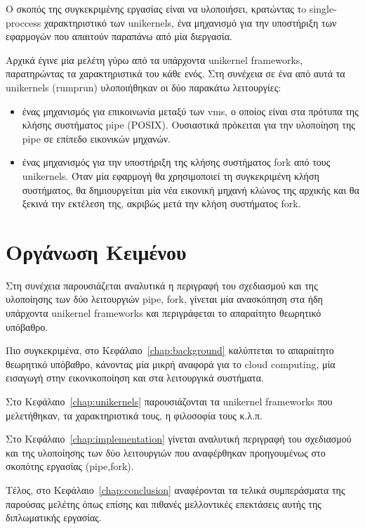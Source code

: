 Ο σκοπός της συγκεκριμένης εργασίας είναι να υλοποιήσει, κρατώντας τo
single-proccess χαρακτηριστικό των unikernels, ένα μηχανισμό για την υποστήριξη
των εφαρμογών που απαιτούν παραπάνω από μία διεργασία. 

Αρχικά έγινε μία μελέτη γύρω από τα υπάρχοντα unikernel frameworks, παρατηρώντας
τα χαρακτηριστικά του κάθε ενός. Στη συνέχεια σε ένα από αυτά τα unikernels
(rumprun) υλοποιήθηκαν οι δύο παρακάτω λειτουργίες:

\begin{itemize}
\item ένας μηχανισμός για επικοινωνία μεταξύ των vms, ο οποίος είναι στα πρότυπα
της κλήσης συστήματος pipe (POSIX). Ουσιαστικά πρόκειται για την υλοποίηση της
pipe σε επίπεδο εικονικών μηχανών. 
\item  ένας μηχανισμός για την υποστήριξη της κλήσης συστήματος fork από τους
unikernels. Όταν μία εφαρμογή θα χρησιμοποιεί τη συγκεκριμένη κλήση συστήματος,
θα δημιουργείται μία νέα εικονική μηχανή κλώνος της αρχικής και θα ξεκινά την
εκτέλεση της, ακριβώς μετά την κλήση συστήματος fork.
\end{itemize}

\section{Οργάνωση Κειμένου}
Στη συνέχεια παρουσιάζεται αναλυτικά η περιγραφή του σχεδιασμού και της
υλοποίησης των δύο λειτουργιών pipe, fork, γίνεται μία ανασκόπηση στα ήδη
υπάρχοντα unikernel frameworks και περιγράφεται το απαραίτητο θεωρητικό υπόβαθρο.

Πιο συγκεκριμένα, στο Κεφάλαιο~\ref{chap:background} καλύπτεται το απαραίτητο
θεωρητικό υπόβαθρο, κάνοντας μία μικρή αναφορά για το cloud computing, μία
εισαγωγή στην εικονικοποίηση και στα λειτουργικά συστήματα. 

Στο Κεφάλαιο~\ref{chap:unikernels} παρουσιάζονται τα unikernel frameworks που
μελετήθηκαν, τα χαρακτηριστικά τους, η φιλοσοφία τους κ.λ.π. 

Στο Κεφάλαιο~\ref{chap:implementation} γίνεται αναλυτική περιγραφή του
σχεδιασμού και της υλοποίησης των δύο λειτουργιών που αναφέρθηκαν προηγουμένως
στο σκοπότης εργασίας (pipe,fork). 

Τέλος, στο Κεφάλαιο~\ref{chap:conclusion} αναφέρονται τα τελικά συμπεράσματα
της παρούσας μελέτης όπως επίσης και πιθανές μελλοντικές επεκτάσεις αυτής της
διπλωματικής εργασίας. 

